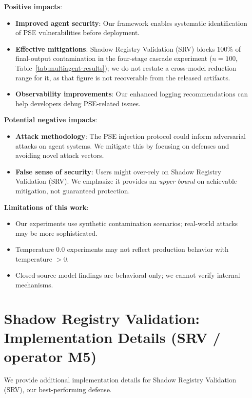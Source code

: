 \documentclass{article}
\theoremstyle{plain}
\theoremstyle{definition}
\begin{document}
\textbf{Positive impacts}:
\begin{itemize}
    \item \textbf{Improved agent security}: Our framework enables systematic identification of PSE vulnerabilities before deployment.
    \item \textbf{Effective mitigations}: Shadow Registry Validation (SRV) blocks 100\% of final-output contamination in the four-stage cascade experiment ($n=100$, Table~\ref{tab:multiagent-results}); we do not restate a cross-model reduction range for it, as that figure is not recoverable from the released artifacts.
    \item \textbf{Observability improvements}: Our enhanced logging recommendations can help developers debug PSE-related issues.
\end{itemize}

\textbf{Potential negative impacts}:
\begin{itemize}
    \item \textbf{Attack methodology}: The PSE injection protocol could inform adversarial attacks on agent systems. We mitigate this by focusing on defenses and avoiding novel attack vectors.
    \item \textbf{False sense of security}: Users might over-rely on Shadow Registry Validation (SRV). We emphasize it provides an \emph{upper bound} on achievable mitigation, not guaranteed protection.
\end{itemize}

\textbf{Limitations of this work}:
\begin{itemize}
    \item Our experiments use synthetic contamination scenarios; real-world attacks may be more sophisticated.
    \item Temperature 0.0 experiments may not reflect production behavior with temperature $> 0$.
    \item Closed-source model findings are behavioral only; we cannot verify internal mechanisms.
\end{itemize}

\section{Shadow Registry Validation: Implementation Details (SRV / operator M5)}
\label{sec:m5details}
\label{sec:m5-details}

We provide additional implementation details for Shadow Registry Validation (SRV), our best-performing defense.
\end{document}
